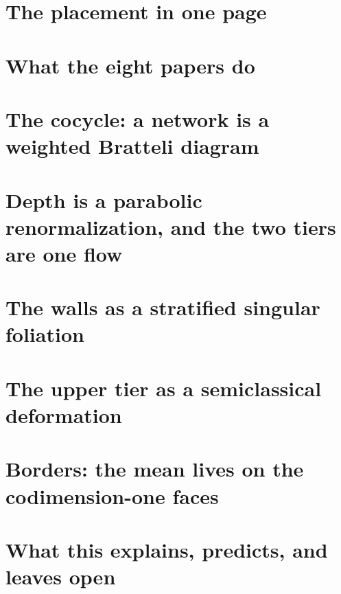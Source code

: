 \documentclass[11pt]{article}
\theoremstyle{plain}
\theoremstyle{definition}\newtheorem{definition}[theorem]{Definition}\newtheorem{remark}[theorem]{Remark}
\begin{document}
\begin{abstract}
birth to the third cumulant. Faces are contractible and every wall has a global defining function, so outer holonomy is trivial and
the noncommutativity is all in this isotropy. (v)~The upper tier is a semiclassical deformation: averaging over Gaussian balls is a
coherent-state (Husimi) symbol with an exact $\sqrt\hbar$ boundary layer at every wall. At the target scale there are $n/4$ unresolved
gates per layer, so the infinite-width description is a kinetic (van Hove) limit rather than a semiclassical one. (vi)~The mean is a
border functional on the codimension-one faces, written as a supertrace pairing of the wall flip with the normal derivative.
Every claim is labelled proved, known, conjectural or an analogy. The identities are checked by \texttt{scripts/verify\_stage11.py}.
\end{abstract}
\tableofcontents
\section{The placement in one page}

\section{What the eight papers do}

\section{The cocycle: a network is a weighted Bratteli diagram}

\section{Depth is a parabolic renormalization, and the two tiers are one flow}

\section{The walls as a stratified singular foliation}

\section{The upper tier as a semiclassical deformation}

\section{Borders: the mean lives on the codimension-one faces}

\section{What this explains, predicts, and leaves open}

\end{document}
